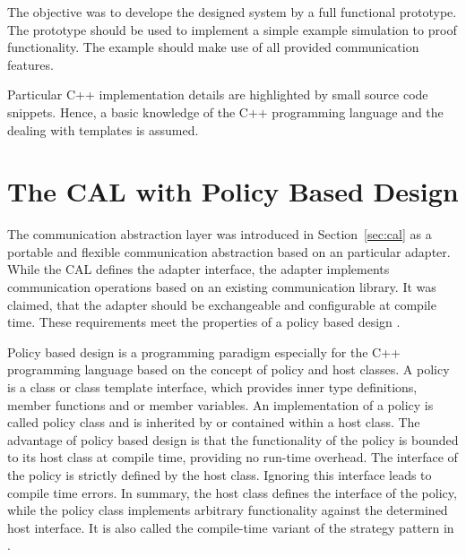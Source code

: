 The objective was to develope the designed system by a full functional prototype.
The prototype should be used to implement a simple example simulation
to proof functionality. The example should make use of all provided
communication features.

Particular C++ implementation details are highlighted by small source
code snippets. Hence, a basic knowledge of the C++ programming
language and the dealing with templates is assumed.

\section{The CAL with Policy Based Design}

The communication abstraction layer was introduced in
Section~\ref{sec:cal} as a portable and flexible communication
abstraction based on an particular adapter. While the CAL defines the
adapter interface, the adapter implements communication operations
based on an existing communication library.  It was claimed, that the
adapter should be exchangeable and configurable at compile time. These
requirements meet the properties of a policy based design
\cite{ref:policy_based_design}.

Policy based design is a programming paradigm especially for the C++
programming language based on the concept of policy and host classes.
A policy is a class or class template interface, which provides inner
type definitions, member functions and or member variables. An
implementation of a policy is called policy class and is inherited by
or contained within a host class.  The advantage of policy based
design is that the functionality of the policy is bounded to its host
class at compile time, providing no run-time overhead.  The interface
of the policy is strictly defined by the host class. Ignoring this
interface leads to compile time errors. In summary, the host class
defines the interface of the policy, while the policy class implements
arbitrary functionality against the determined host interface. It is
also called the compile-time variant of the strategy pattern in
\cite{ref:policy_strategy}.


